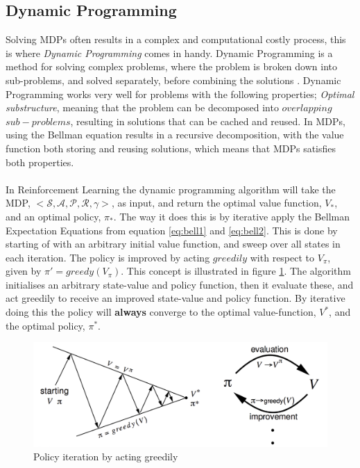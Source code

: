 \subsection{Dynamic Programming}
Solving MDPs often results in a complex and computational costly process, this is where \textit{Dynamic Programming} comes in handy. Dynamic Programming is a method for solving complex problems, where the problem is broken down into sub-problems, and solved separately, before combining the solutions \cite{Silver}. Dynamic Programming works very well for problems with the following properties; \textit{Optimal substructure}, meaning that the problem can be decomposed into $overlapping$ $sub-problems$, resulting in solutions that can be cached and reused. In MDPs, using the Bellman equation results in a recursive decomposition, with the value function both storing and reusing solutions, which means that MDPs satisfies both properties.\\\\
In Reinforcement Learning the dynamic programming algorithm will take the MDP, $<\mathcal{S, A, P, R, \gamma}>$, as input, and return the optimal value function, $V_{*}$, and an optimal policy, $\pi_{*}$. The way it does this is by iterative apply the Bellman Expectation Equations from equation \ref{eq:bell1} and \ref{eq:bell2}. This is done by starting of with an arbitrary initial value function, and sweep over all states in each iteration. The policy is improved by acting $greedily$ with respect to $V_{\pi}$, given by $\pi'=greedy(V_{\pi})$. This concept is illustrated in figure \ref{fig:greedily}. The algorithm initialises an arbitrary state-value and policy function, then it evaluate these, and act greedily to receive an improved state-value and policy function. By iterative doing this the policy will \textbf{always} converge to the optimal value-function, $V^{*}$, and the optimal policy, $\pi^{*}$. 
\begin{figure}[H]
    \centering
    \includegraphics[width=0.75\linewidth]{images/chap2/policy-iteration.png}
    \caption{Policy iteration by acting greedily\cite{Silver}}
    \label{fig:greedily}
\end{figure}

